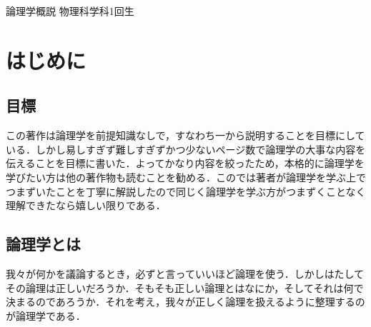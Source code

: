 \documentclass[10pt,b5paper,papersize,dvipdfmx]{jsbook}
\begin{document}
\newcommand\rmA{\mathrm{A}}
\newcommand\rmB{\mathrm{B}}
\newcommand\rmC{\mathrm{C}}

\newcommand\maru[1]{\textcircled{\scriptsize{}#1}}


\kaishititle%
  {論理学概説}%
  {物理科学科1回生}%
  {}%

\section{はじめに}
\subsection{目標}
この著作は論理学を前提知識なしで，すなわち一から説明することを目標にしている．しかし易しすぎず難しすぎずかつ少ないページ数で論理学の大事な内容を伝えることを目標に書いた．よってかなり内容を絞ったため，本格的に論理学を学びたい方は他の著作物も読むことを勧める．このでは著者が論理学を学ぶ上でつまずいたことを丁寧に解説したので同じく論理学を学ぶ方がつまずくことなく理解できたなら嬉しい限りである．

\subsection{論理学とは}
我々が何かを議論するとき，必ずと言っていいほど論理を使う．しかしはたしてその論理は正しいだろうか．そもそも正しい論理とはなにか，そしてそれは何で決まるのであろうか．それを考え，我々が正しく論理を扱えるように整理するのが論理学である．
\end{document}

